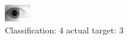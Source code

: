 \begin{figure}[h!]
\begin{center}
\includegraphics[width=0.60\columnwidth]{figures/ID1954_class_4_target_3.png}
\end{center}
\caption{ Classification: 4 actual target: 3}
\label{fig:ID1954_class_4_target_3}
\end{figure}
